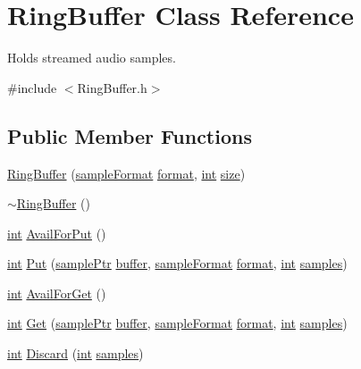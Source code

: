 \hypertarget{class_ring_buffer}{}\section{Ring\+Buffer Class Reference}
\label{class_ring_buffer}


Holds streamed audio samples.  




{\ttfamily \#include $<$Ring\+Buffer.\+h$>$}

\subsection*{Public Member Functions}
\begin{DoxyCompactItemize}
\item 
\hyperlink{class_ring_buffer_a34136981ce1f78c605222c21ef626f9b}{Ring\+Buffer} (\hyperlink{include_2audacity_2_types_8h_a9938d2e2f6adef23e745cd80ef379792}{sample\+Format} \hyperlink{_export_p_c_m_8cpp_a317afff57d87a89158c2b038d37b2b08}{format}, \hyperlink{xmltok_8h_a5a0d4a5641ce434f1d23533f2b2e6653}{int} \hyperlink{group__lavu__mem_ga854352f53b148adc24983a58a1866d66}{size})
\item 
\hyperlink{class_ring_buffer_a2715b2e99ea24521ef7a586c2f33e1c9}{$\sim$\+Ring\+Buffer} ()
\item 
\hyperlink{xmltok_8h_a5a0d4a5641ce434f1d23533f2b2e6653}{int} \hyperlink{class_ring_buffer_a4e821062ef3a284889198ef1e6b60067}{Avail\+For\+Put} ()
\item 
\hyperlink{xmltok_8h_a5a0d4a5641ce434f1d23533f2b2e6653}{int} \hyperlink{class_ring_buffer_a21f4e21a19889e4d9d29c39ebd0315ba}{Put} (\hyperlink{include_2audacity_2_types_8h_aaafb46d1caf7c79262fec96b577215fe}{sample\+Ptr} \hyperlink{structbuffer}{buffer}, \hyperlink{include_2audacity_2_types_8h_a9938d2e2f6adef23e745cd80ef379792}{sample\+Format} \hyperlink{_export_p_c_m_8cpp_a317afff57d87a89158c2b038d37b2b08}{format}, \hyperlink{xmltok_8h_a5a0d4a5641ce434f1d23533f2b2e6653}{int} \hyperlink{test__w__saw8_8c_a54185623a5a093f671a73e5fba6197a1}{samples})
\item 
\hyperlink{xmltok_8h_a5a0d4a5641ce434f1d23533f2b2e6653}{int} \hyperlink{class_ring_buffer_a4a687abf19522e2775caca7545a5fabb}{Avail\+For\+Get} ()
\item 
\hyperlink{xmltok_8h_a5a0d4a5641ce434f1d23533f2b2e6653}{int} \hyperlink{class_ring_buffer_a0868f1c2db02581aadae812817a5351e}{Get} (\hyperlink{include_2audacity_2_types_8h_aaafb46d1caf7c79262fec96b577215fe}{sample\+Ptr} \hyperlink{structbuffer}{buffer}, \hyperlink{include_2audacity_2_types_8h_a9938d2e2f6adef23e745cd80ef379792}{sample\+Format} \hyperlink{_export_p_c_m_8cpp_a317afff57d87a89158c2b038d37b2b08}{format}, \hyperlink{xmltok_8h_a5a0d4a5641ce434f1d23533f2b2e6653}{int} \hyperlink{test__w__saw8_8c_a54185623a5a093f671a73e5fba6197a1}{samples})
\item 
\hyperlink{xmltok_8h_a5a0d4a5641ce434f1d23533f2b2e6653}{int} \hyperlink{class_ring_buffer_a64548ef0f11947c51e7b838f04504292}{Discard} (\hyperlink{xmltok_8h_a5a0d4a5641ce434f1d23533f2b2e6653}{int} \hyperlink{test__w__saw8_8c_a54185623a5a093f671a73e5fba6197a1}{samples})
\end{DoxyCompactItemize}


